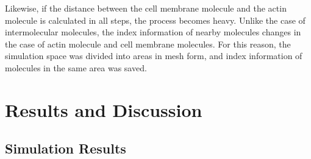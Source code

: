 \documentclass[a4paper,12pt, oneside]{book}
\begin{document}
Likewise, if the distance between the cell membrane molecule and the actin molecule is calculated in all steps, the process becomes heavy.
Unlike the case of intermolecular molecules, the index information of nearby molecules changes in the case of actin molecule and cell membrane molecules.
For this reason, the simulation space was divided into areas in mesh form, and index information of molecules in the same area was saved.


\chapter{Results and Discussion}
\section{Simulation Results}
\end{document}
